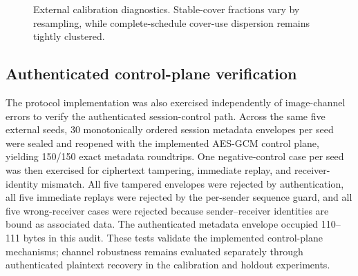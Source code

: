 \begin{figure}[!htbp]
\centering
\begin{minipage}[t]{.46\textwidth}
\centering
{}
\end{minipage}\hfill
\begin{minipage}[t]{.46\textwidth}
\centering
{}
\end{minipage}
\caption{External calibration diagnostics. Stable-cover fractions vary by resampling, while complete-schedule cover-use dispersion remains tightly clustered.}
\label{fig:caldiag}
\end{figure}

\subsection{Authenticated control-plane verification}
The protocol implementation was also exercised independently of image-channel errors to verify the authenticated session-control path. Across the same five external seeds, 30 monotonically ordered session metadata envelopes per seed were sealed and reopened with the implemented AES-GCM control plane, yielding 150/150 exact metadata roundtrips. One negative-control case per seed was then exercised for ciphertext tampering, immediate replay, and receiver-identity mismatch. All five tampered envelopes were rejected by authentication, all five immediate replays were rejected by the per-sender sequence guard, and all five wrong-receiver cases were rejected because sender--receiver identities are bound as associated data. The authenticated metadata envelope occupied 110--111 bytes in this audit. These tests validate the implemented control-plane mechanisms; channel robustness remains evaluated separately through authenticated plaintext recovery in the calibration and holdout experiments.

